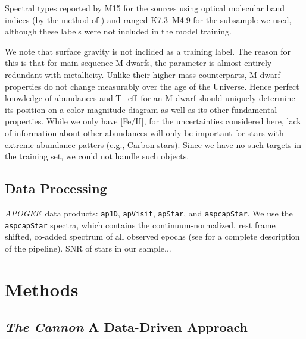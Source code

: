 \documentclass[modern]{aastex62}
\newcommand{\apogee}{\textsl{APOGEE}}
\newcommand{\thecannon}{\textsl{The Cannon}}
\newcommand{\teff}{T_{\rm eff}}
\begin{document}
Spectral types reported by M15 for the sources using optical molecular band indices (by the method of \citealt{Lepine:2013}) and ranged K7.3--M4.9 for the subsample we used, although these labels were not included in the model training.

We note that surface gravity is not inclided as a training label. The reason for this is that for main-sequence M dwarfs, the parameter is almost entirely redundant with metallicity. Unlike their higher-mass counterparts, M dwarf properties do not change measurably over the age of the Universe. Hence perfect knowledge of abundances and \teff\ for an M dwarf should uniquely determine its position on a color-magnitude diagram as well as its other fundamental properties. While we only have [Fe/H], for the uncertainties considered here, lack of information about other abundances will only be important for stars with extreme abundance patters (e.g., Carbon stars). Since we have no such targets in the training set, we could not handle such objects. 


\subsection{Data Processing}

\apogee\ data products: {\tt\string ap1D}, {\tt\string apVisit}, {\tt\string apStar}, and {\tt\string aspcapStar}. We use the {\tt\string aspcapStar} spectra, which contains the continuum-normalized, rest frame shifted, co-added spectrum of all observed epochs (see \citealt{Perez:2016} for a complete description of the pipeline). SNR of stars in our sample...


\section{Methods} \label{sec:cannon}

\subsection{\thecannon\: A Data-Driven Approach}
\end{document}
